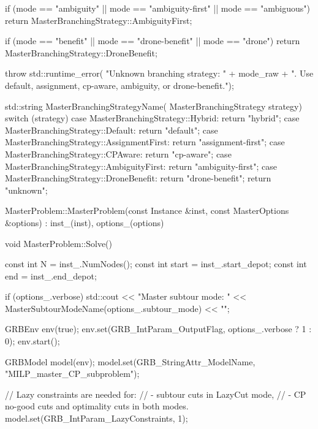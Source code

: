 {{{            if (mode == "ambiguity" ||
                mode == "ambiguity-first" ||
                mode == "ambiguous")
            {
                return MasterBranchingStrategy::AmbiguityFirst;
            }

            if (mode == "benefit" ||
                mode == "drone-benefit" ||
                mode == "drone")
            {
                return MasterBranchingStrategy::DroneBenefit;
            }

            throw std::runtime_error(
                "Unknown branching strategy: " + mode_raw +
                ". Use default, assignment, cp-aware, ambiguity, or drone-benefit.");
        }

        std::string MasterBranchingStrategyName(
            MasterBranchingStrategy strategy)
        {
            switch (strategy)
            {
            case MasterBranchingStrategy::Hybrid:
                return "hybrid";
            case MasterBranchingStrategy::Default:
                return "default";
            case MasterBranchingStrategy::AssignmentFirst:
                return "assignment-first";
            case MasterBranchingStrategy::CPAware:
                return "cp-aware";
            case MasterBranchingStrategy::AmbiguityFirst:
                return "ambiguity-first";
            case MasterBranchingStrategy::DroneBenefit:
                return "drone-benefit";
            }
            return "unknown";
        }

        MasterProblem::MasterProblem(const Instance &inst, const MasterOptions &options)
            : inst_(inst), options_(options) {}

        void MasterProblem::Solve()
        {
            const int N = inst_.NumNodes();
            const int start = inst_.start_depot;
            const int end = inst_.end_depot;

            if (options_.verbose)
            {
                std::cout << "Master subtour mode: "
                          << MasterSubtourModeName(options_.subtour_mode)
                          << "\n";
            }

            GRBEnv env(true);
            env.set(GRB_IntParam_OutputFlag, options_.verbose ? 1 : 0);
            env.start();

            GRBModel model(env);
            model.set(GRB_StringAttr_ModelName, "MILP_master_CP_subproblem");

            // Lazy constraints are needed for:
            //   - subtour cuts in LazyCut mode,
            //   - CP no-good cuts and optimality cuts in both modes.
            model.set(GRB_IntParam_LazyConstraints, 1);

}}}
